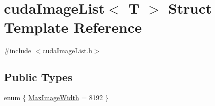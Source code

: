 \hypertarget{structcuda_image_list}{}\section{cuda\+Image\+List$<$ T $>$ Struct Template Reference}
\label{structcuda_image_list}


{\ttfamily \#include $<$cuda\+Image\+List.\+h$>$}

\subsection*{Public Types}
\begin{DoxyCompactItemize}
\item 
enum \{ \hyperlink{structcuda_image_list_a1b8db76e0fc065a9133a753dcf8664b6a197720e0aff172992408e8de3cbd6e4a}{Max\+Image\+Width} = 8192
 \}
\end{DoxyCompactItemize}
